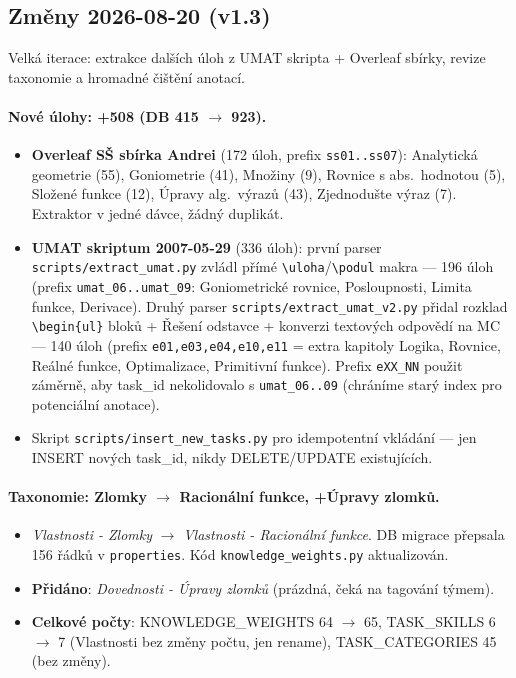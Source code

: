\documentclass[11pt,a4paper]{article}
\begin{document}
\subsection{Změny 2026-08-20 (v1.3)}

Velká iterace: extrakce dalších úloh z UMAT skripta + Overleaf sbírky, revize taxonomie a hromadné čištění anotací.

\paragraph{Nové úlohy: +508 (DB 415 $\rightarrow$ 923).}
\begin{itemize}
  \item \textbf{Overleaf SŠ sbírka Andrei} (172 úloh, prefix \texttt{ss01..ss07}): Analytická geometrie (55), Goniometrie (41), Množiny (9), Rovnice s abs.~hodnotou (5), Složené funkce (12), Úpravy alg.~výrazů (43), Zjednodušte výraz (7). Extraktor v jedné dávce, žádný duplikát.
  \item \textbf{UMAT skriptum 2007-05-29} (336 úloh): první parser \texttt{scripts/extract\_umat.py} zvládl přímé \texttt{\textbackslash uloha}/\texttt{\textbackslash podul} makra --- 196 úloh (prefix \texttt{umat\_06..umat\_09}: Goniometrické rovnice, Posloupnosti, Limita funkce, Derivace). Druhý parser \texttt{scripts/extract\_umat\_v2.py} přidal rozklad \texttt{\textbackslash begin\{ul\}} bloků + Řešení odstavce + konverzi textových odpovědí na MC --- 140 úloh (prefix \texttt{e01,e03,e04,e10,e11} = extra kapitoly Logika, Rovnice, Reálné funkce, Optimalizace, Primitivní funkce). Prefix \texttt{eXX\_NN} použit záměrně, aby task\_id nekolidovalo s \texttt{umat\_06..09} (chráníme starý index pro potenciální anotace).
  \item Skript \texttt{scripts/insert\_new\_tasks.py} pro idempotentní vkládání --- jen INSERT nových task\_id, nikdy DELETE/UPDATE existujících.
\end{itemize}

\paragraph{Taxonomie: Zlomky $\rightarrow$ Racionální funkce, +Úpravy zlomků.}
\begin{itemize}
  \item \emph{Vlastnosti - Zlomky} $\rightarrow$ \emph{Vlastnosti - Racionální funkce}. DB migrace přepsala 156 řádků v \texttt{properties}. Kód \texttt{knowledge\_weights.py} aktualizován.
  \item \textbf{Přidáno}: \emph{Dovednosti - Úpravy zlomků} (prázdná, čeká na tagování týmem).
  \item \textbf{Celkové počty}: KNOWLEDGE\_WEIGHTS 64 $\rightarrow$ 65, TASK\_SKILLS 6 $\rightarrow$ 7 (Vlastnosti bez změny počtu, jen rename), TASK\_CATEGORIES 45 (bez změny).
\end{itemize}
\end{document}
